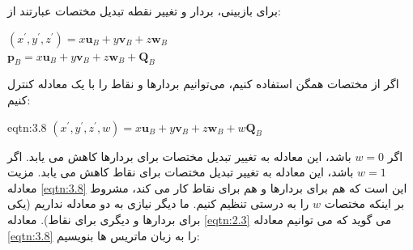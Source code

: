 {
    \Large
    \begin{spacing}{1.5}
        برای بازبینی، بردار و تغییر نقطه تبدیل مختصات عبارتند از:

        \begin{flushleft}
            $(x^\prime,y^\prime,z^\prime)=x\textbf{u}_{B}+y\textbf{v}_{B}+z\textbf{w}_{B}$ \\
            $\textbf{p}_{B}=x\textbf{u}_{B}+y\textbf{v}_{B}+z\textbf{w}_{B}+\textbf{Q}_{B}$ 
        \end{flushleft}

        اگر از مختصات همگن استفاده کنیم، می‌توانیم بردارها و نقاط را با یک معادله کنترل کنیم:

        \begin{eqtn}{eqtn:3.8}
            \centering
            $(x^\prime,y^\prime,z^\prime,w)=x\textbf{u}_{B}+y\textbf{v}_{B}+z\textbf{w}_{B}+w\textbf{Q}_{B}$
        \end{eqtn}

        اگر $w=0$ باشد، این معادله به تغییر تبدیل مختصات برای بردارها کاهش می یابد.
        اگر $w=1$ باشد، این معادله به تغییر تبدیل مختصات برای نقاط کاهش می یابد.
        مزیت معادله \ref{eqtn:3.8} این است که هم برای بردارها و هم برای نقاط کار می کند، مشروط بر اینکه مختصات $w$ را به درستی تنظیم کنیم.
        ما دیگر نیازی به دو معادله نداریم (یکی برای بردارها و دیگری برای نقاط). معادله \ref{eqtn:2.3} می گوید که می توانیم معادله \ref{eqtn:3.8} را به زبان ماتریس ها بنویسیم:


\end{spacing}}
